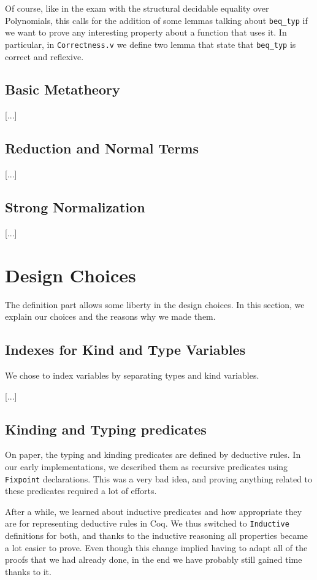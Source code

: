 \documentclass[a4paper,11pt]{article}
\begin{document}
Of course, like in the exam with the structural decidable equality over
Polynomials, this calls for the addition of some lemmas talking about
\verb|beq_typ| if we want to prove any interesting property about a
function that uses it. In particular, in \verb|Correctness.v| we
define two lemma that state that \verb|beq_typ| is correct and
reflexive.

\subsection{Basic Metatheory}

[...]

\subsection{Reduction and Normal Terms}

[...]

\subsection{Strong Normalization}

[...]


\section{Design Choices}

The definition part allows some liberty in the design choices. In this
section, we explain our choices and the reasons why we made them.

\subsection{Indexes for Kind and Type Variables}

We chose to index variables by separating types and kind variables.

[...]

\subsection{Kinding and Typing predicates}

On paper, the typing and kinding predicates are defined by deductive
rules. In our early implementations, we described them as recursive
predicates using \verb|Fixpoint| declarations. This was a very bad
idea, and proving anything related to these predicates required a lot
of efforts.

After a while, we learned about inductive predicates and how
appropriate they are for representing deductive rules in Coq. We thus
switched to \verb|Inductive| definitions for both, and thanks to the
inductive reasoning all properties became a lot easier to prove. Even
though this change implied having to adapt all of the proofs that we
had already done, in the end we have probably still gained time thanks
to it.
\end{document}

